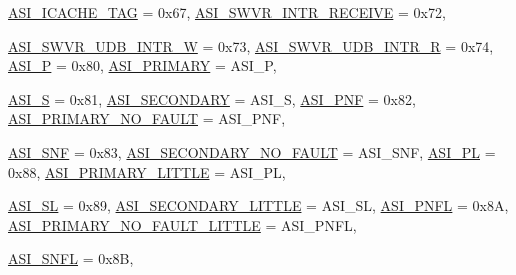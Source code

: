 \begin{DoxyCompactItemize}
\hyperlink{namespaceSparcISA_a6dd43f1311515252b283f56d7095a1f3ad9aeb450776207aa10613f5dd02e06ba}{ASI\_\-ICACHE\_\-TAG} =  0x67, 
\hyperlink{namespaceSparcISA_a6dd43f1311515252b283f56d7095a1f3a05669b9b99806fc02f7b9aba7309658f}{ASI\_\-SWVR\_\-INTR\_\-RECEIVE} =  0x72, 
\par
\hyperlink{namespaceSparcISA_a6dd43f1311515252b283f56d7095a1f3a035868467ef161363dc8cb039f22c9e1}{ASI\_\-SWVR\_\-UDB\_\-INTR\_\-W} =  0x73, 
\hyperlink{namespaceSparcISA_a6dd43f1311515252b283f56d7095a1f3af692dc2c4c99d6ae0248b83b9c7d9343}{ASI\_\-SWVR\_\-UDB\_\-INTR\_\-R} =  0x74, 
\hyperlink{namespaceSparcISA_a6dd43f1311515252b283f56d7095a1f3a2b7422efe9682fe69ba53cda687a3666}{ASI\_\-P} =  0x80, 
\hyperlink{namespaceSparcISA_a6dd43f1311515252b283f56d7095a1f3aa6ce5a526e1048ac6d241bb947629eb3}{ASI\_\-PRIMARY} =  ASI\_\-P, 
\par
\hyperlink{namespaceSparcISA_a6dd43f1311515252b283f56d7095a1f3ace4f571bb3cf23865d6c2a0634819c0b}{ASI\_\-S} =  0x81, 
\hyperlink{namespaceSparcISA_a6dd43f1311515252b283f56d7095a1f3a40285262464ab12116ecb0e0e560c0fa}{ASI\_\-SECONDARY} =  ASI\_\-S, 
\hyperlink{namespaceSparcISA_a6dd43f1311515252b283f56d7095a1f3aef7b64d19d2617d1f894474c4f3dd2c6}{ASI\_\-PNF} =  0x82, 
\hyperlink{namespaceSparcISA_a6dd43f1311515252b283f56d7095a1f3a6e5d5e20565e38b059b487beea7ff0c6}{ASI\_\-PRIMARY\_\-NO\_\-FAULT} =  ASI\_\-PNF, 
\par
\hyperlink{namespaceSparcISA_a6dd43f1311515252b283f56d7095a1f3a327e29faa090cb552e673dec255e1000}{ASI\_\-SNF} =  0x83, 
\hyperlink{namespaceSparcISA_a6dd43f1311515252b283f56d7095a1f3a41cc8513f000d08feac55e5eb8598677}{ASI\_\-SECONDARY\_\-NO\_\-FAULT} =  ASI\_\-SNF, 
\hyperlink{namespaceSparcISA_a6dd43f1311515252b283f56d7095a1f3ac12c08e8766135656ffc15cfd7a80406}{ASI\_\-PL} =  0x88, 
\hyperlink{namespaceSparcISA_a6dd43f1311515252b283f56d7095a1f3a537c989cfe35b259013019e39efd513b}{ASI\_\-PRIMARY\_\-LITTLE} =  ASI\_\-PL, 
\par
\hyperlink{namespaceSparcISA_a6dd43f1311515252b283f56d7095a1f3a425cd52bfd9d78cee43e9982091f66e0}{ASI\_\-SL} =  0x89, 
\hyperlink{namespaceSparcISA_a6dd43f1311515252b283f56d7095a1f3a08b6bae197b0cca673d90d756716cdfa}{ASI\_\-SECONDARY\_\-LITTLE} =  ASI\_\-SL, 
\hyperlink{namespaceSparcISA_a6dd43f1311515252b283f56d7095a1f3a2e1d35a357d1a1424828a2a17443d4e8}{ASI\_\-PNFL} =  0x8A, 
\hyperlink{namespaceSparcISA_a6dd43f1311515252b283f56d7095a1f3a93dd95abdcad505b07ebc22ad329034a}{ASI\_\-PRIMARY\_\-NO\_\-FAULT\_\-LITTLE} =  ASI\_\-PNFL, 
\par
\hyperlink{namespaceSparcISA_a6dd43f1311515252b283f56d7095a1f3aa41242b00203bfa99e9650227006e7de}{ASI\_\-SNFL} =  0x8B, 

\end{DoxyCompactItemize}
